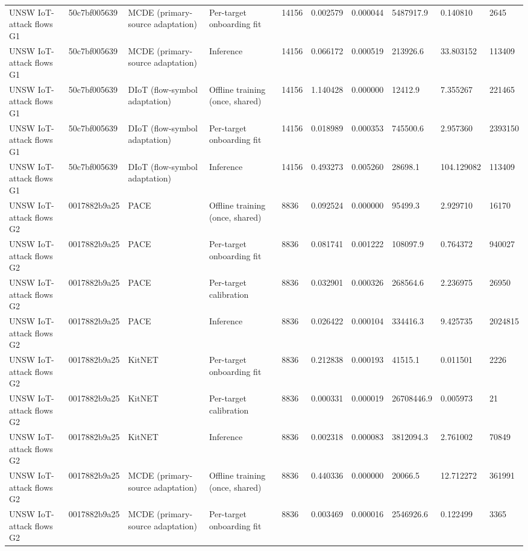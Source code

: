 \begin{tabular}{llllllllll}
UNSW IoT-attack flows G1 & 50c7bf005639 & MCDE (primary-source adaptation) & Per-target onboarding fit & 14156 & 0.002579 & 0.000044 & 5487917.9 & 0.140810 & 2645 \\
UNSW IoT-attack flows G1 & 50c7bf005639 & MCDE (primary-source adaptation) & Inference & 14156 & 0.066172 & 0.000519 & 213926.6 & 33.803152 & 113409 \\
UNSW IoT-attack flows G1 & 50c7bf005639 & DIoT (flow-symbol adaptation) & Offline training (once, shared) & 14156 & 1.140428 & 0.000000 & 12412.9 & 7.355267 & 221465 \\
UNSW IoT-attack flows G1 & 50c7bf005639 & DIoT (flow-symbol adaptation) & Per-target onboarding fit & 14156 & 0.018989 & 0.000353 & 745500.6 & 2.957360 & 2393150 \\
UNSW IoT-attack flows G1 & 50c7bf005639 & DIoT (flow-symbol adaptation) & Inference & 14156 & 0.493273 & 0.005260 & 28698.1 & 104.129082 & 113409 \\
UNSW IoT-attack flows G2 & 0017882b9a25 & PACE & Offline training (once, shared) & 8836 & 0.092524 & 0.000000 & 95499.3 & 2.929710 & 16170 \\
UNSW IoT-attack flows G2 & 0017882b9a25 & PACE & Per-target onboarding fit & 8836 & 0.081741 & 0.001222 & 108097.9 & 0.764372 & 940027 \\
UNSW IoT-attack flows G2 & 0017882b9a25 & PACE & Per-target calibration & 8836 & 0.032901 & 0.000326 & 268564.6 & 2.236975 & 26950 \\
UNSW IoT-attack flows G2 & 0017882b9a25 & PACE & Inference & 8836 & 0.026422 & 0.000104 & 334416.3 & 9.425735 & 2024815 \\
UNSW IoT-attack flows G2 & 0017882b9a25 & KitNET & Per-target onboarding fit & 8836 & 0.212838 & 0.000193 & 41515.1 & 0.011501 & 2226 \\
UNSW IoT-attack flows G2 & 0017882b9a25 & KitNET & Per-target calibration & 8836 & 0.000331 & 0.000019 & 26708446.9 & 0.005973 & 21 \\
UNSW IoT-attack flows G2 & 0017882b9a25 & KitNET & Inference & 8836 & 0.002318 & 0.000083 & 3812094.3 & 2.761002 & 70849 \\
UNSW IoT-attack flows G2 & 0017882b9a25 & MCDE (primary-source adaptation) & Offline training (once, shared) & 8836 & 0.440336 & 0.000000 & 20066.5 & 12.712272 & 361991 \\
UNSW IoT-attack flows G2 & 0017882b9a25 & MCDE (primary-source adaptation) & Per-target onboarding fit & 8836 & 0.003469 & 0.000016 & 2546926.6 & 0.122499 & 3365 \\

\end{tabular}

